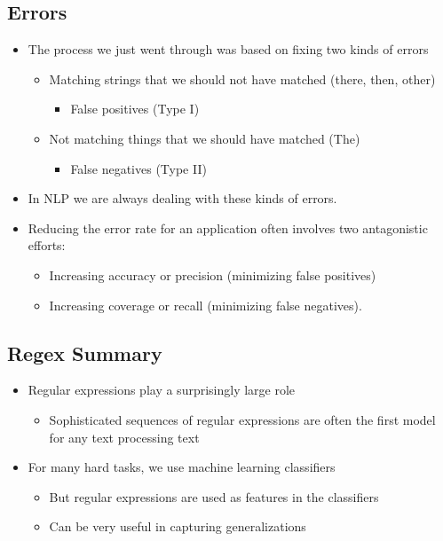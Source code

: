 \documentclass[11pt]{article}
\theoremstyle{definition}
\begin{document}
\subsection{Errors}
\begin{itemize}
  \item The process we just went through was based on fixing
  two kinds of errors
  \begin{itemize}
    \item Matching strings that we should not have matched (there,
    then, other)
    \begin{itemize}
      \item False positives (Type I)
    \end{itemize}
    \item Not matching things that we should have matched (The)
    \begin{itemize}
      \item False negatives (Type II)
    \end{itemize}
  \end{itemize}
  \item In NLP we are always dealing with these kinds of
  errors.
  \item Reducing the error rate for an application often
  involves two antagonistic efforts:
  \begin{itemize}
    \item Increasing accuracy or precision (minimizing false positives)
    \item Increasing coverage or recall (minimizing false negatives).
  \end{itemize}
\end{itemize}

\subsection{Regex Summary}
\begin{itemize}
  \item Regular expressions play a surprisingly large role
  \begin{itemize}
    \item Sophisticated sequences of regular expressions are often the first model
    for any text processing text
  \end{itemize}
\end{itemize}
\begin{itemize}
  \item For many hard tasks, we use machine learning classifiers
  \begin{itemize}
    \item But regular expressions are used as features in the classifiers
    \item Can be very useful in capturing generalizations
  \end{itemize}
\end{itemize}
\end{document}
